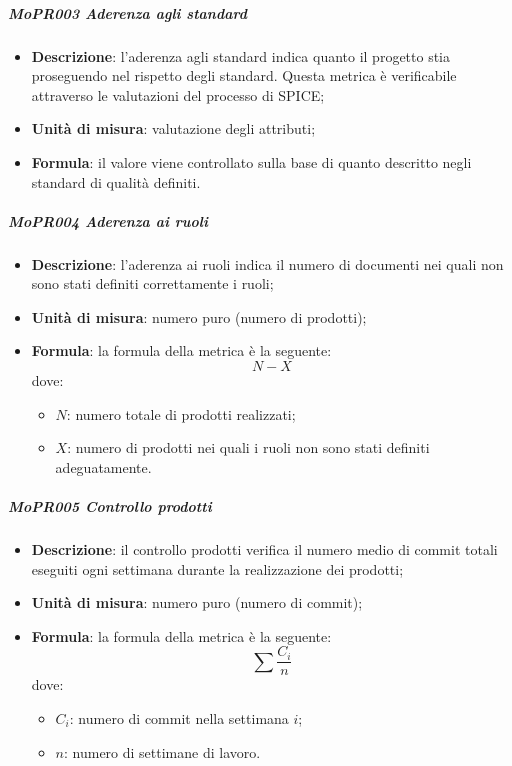 \documentclass[../norme-di-progetto.tex]{subfiles}
\begin{document}
\subparagraph{MoPR003 Aderenza agli standard}
\begin{itemize}
  \item \textbf{Descrizione}: l'aderenza agli standard indica quanto il progetto stia proseguendo nel rispetto degli standard. Questa metrica è verificabile attraverso le valutazioni del processo di SPICE;
  \item \textbf{Unità di misura}: valutazione degli attributi;
  \item \textbf{Formula}: il valore viene controllato sulla base di quanto descritto negli standard di qualità definiti.
\end{itemize}
\subparagraph{MoPR004 Aderenza ai ruoli}
\begin{itemize}
  \item \textbf{Descrizione}: l'aderenza ai ruoli indica il numero di documenti nei quali non sono stati definiti correttamente i ruoli;
  \item \textbf{Unità di misura}: numero puro (numero di prodotti);
  \item \textbf{Formula}: la formula della metrica è la seguente:
  \begin{displaymath}
    N - X
  \end{displaymath}
  dove:
  \begin{itemize}
    \item $ N $: numero totale di prodotti realizzati;
    \item $ X $: numero di prodotti nei quali i ruoli non sono stati definiti adeguatamente.
  \end{itemize}
\end{itemize}
\subparagraph{MoPR005 Controllo prodotti}
\begin{itemize}
  \item \textbf{Descrizione}: il controllo prodotti verifica il numero medio di commit totali eseguiti ogni settimana durante la realizzazione dei prodotti;
  \item \textbf{Unità di misura}: numero puro (numero di commit);
  \item \textbf{Formula}: la formula della metrica è la seguente:
  \begin{displaymath}
    \sum \frac{C_i}{n}
  \end{displaymath}
  dove:
  \begin{itemize}
    \item $ C_i $: numero di commit nella settimana $ i $;
    \item $ n $: numero di settimane di lavoro.
  \end{itemize}
\end{itemize}
\end{document}
